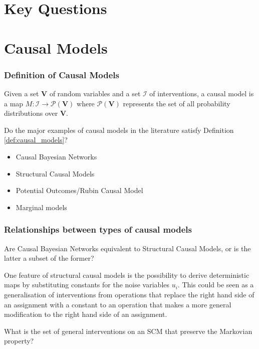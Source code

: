 
\section{Key Questions}

\section{Causal Models}

\subsubsection{Definition of Causal Models}

\begin{definition}\label{def:causal_models}
Given a set $\mathbf{V}$ of random variables and a set $\mathcal{I}$ of interventions, a causal model is a map $M:\mathcal{I}\to \mathcal{P}(\mathbf{V})$ where $\mathcal{P}(\mathbf{V})$ represents the set of all probability distributions over $\mathbf{V}$.
\end{definition}

\begin{question}
    Do the major examples of causal models in the literature satisfy Definition \ref{def:causal_models}?
    \begin{itemize}
        \item Causal Bayesian Networks
        \item Structural Causal Models
        \item Potential Outcomes/Rubin Causal Model
        \item Marginal models
    \end{itemize}
\end{question}

\subsubsection{Relationships between types of causal models}

\begin{question}
    Are Causal Bayesian Networks equivalent to Structural Causal Models, or is the latter a subset of the former?
\end{question}

\begin{question}
    One feature of structural causal models is the possibility to derive deterministic maps by substituting constants for the noise variables $u_i$. This could be seen as a generalisation of interventions from operations that replace the right hand side of an assignment with a constant to an operation that makes a more general modification to the right hand side of an assignment.
    
    What is the set of general interventions on an SCM that preserve the Markovian property?
\end{question}

